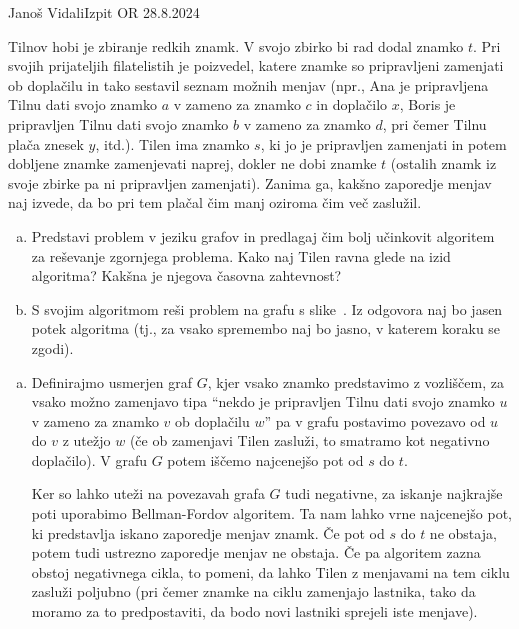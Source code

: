 \begin{naloga}{Janoš Vidali}{Izpit OR 28.8.2024}
\begin{vprasanje}
Tilnov hobi je zbiranje redkih znamk.
V svojo zbirko bi rad dodal znamko $t$.
Pri svojih prijateljih filatelistih je poizvedel,
katere znamke so pripravljeni zamenjati ob doplačilu
in tako sestavil seznam možnih menjav
(npr.,
Ana je pripravljena Tilnu dati svojo znamko $a$
v zameno za znamko $c$ in doplačilo $x$,
Boris je pri\-prav\-ljen Tilnu dati svojo znamko $b$
v zameno za znamko $d$, pri čemer Tilnu plača znesek $y$, itd.).
Tilen ima znamko $s$,
ki jo je pripravljen zamenjati
in potem dobljene znamke zamenjevati naprej,
dokler ne dobi znamke $t$
(ostalih znamk iz svoje zbirke pa ni pri\-prav\-ljen zamenjati).
Zanima ga, kakšno zaporedje menjav naj izvede,
da bo pri tem plačal čim manj oziroma čim več zaslužil.

\begin{enumerate}[(a)]
\item Predstavi problem v jeziku grafov
in predlagaj čim bolj učinkovit algoritem za reševanje zgornjega problema.
Kako naj Tilen ravna glede na izid algoritma?
Kak\-šna je njegova časovna zahtevnost?

\item S svojim algoritmom reši problem na grafu s slike~\fig.
Iz odgovora naj bo jasen potek algoritma
(tj., za vsako spremembo naj bo jasno, v katerem koraku se zgodi).
\end{enumerate}

\begin{slika}
\pgfslika
{}
\end{slika}
\end{vprasanje}

\begin{odgovor}
\begin{enumerate}[(a)]
\item Definirajmo usmerjen graf $G$,
kjer vsako znamko predstavimo z vozliščem,
za vsako možno zamenjavo tipa
``nekdo je pripravljen Tilnu dati svojo znamko $u$
v zameno za znamko $v$ ob doplačilu $w$''
pa v grafu postavimo povezavo od $u$ do $v$ z utežjo $w$
(če ob zamenjavi Tilen zasluži,
to smatramo kot negativno doplačilo).
V grafu $G$ potem iščemo najcenejšo pot od $s$ do $t$.

Ker so lahko uteži na povezavah grafa $G$ tudi negativne,
za iskanje najkrajše poti uporabimo Bellman-Fordov algoritem.
Ta nam lahko vrne najcenejšo pot,
ki predstavlja iskano zaporedje menjav znamk.
Če pot od $s$ do $t$ ne obstaja,
potem tudi ustrezno zaporedje menjav ne obstaja.
Če pa algoritem zazna obstoj negativnega cikla,
to pomeni, da lahko Tilen z menjavami na tem ciklu zasluži poljubno
(pri čemer znamke na ciklu zamenjajo lastnika,
tako da moramo za to predpostaviti,
da bodo novi lastniki sprejeli iste menjave).


\end{enumerate}
\end{odgovor}
\end{naloga}
